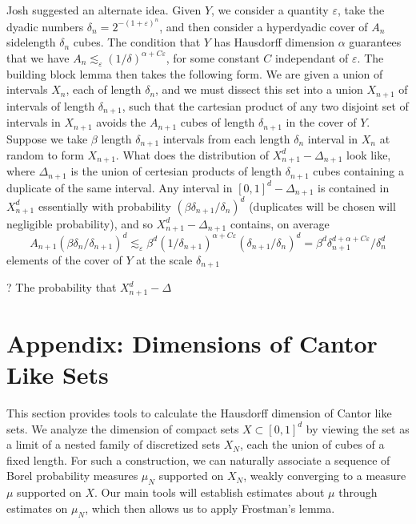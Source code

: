 \documentclass{report}
\theoremstyle{plain}
\theoremstyle{plain}
\begin{document}
Josh suggested an alternate idea. Given $Y$, we consider a quantity $\varepsilon$, take the dyadic numbers $\delta_n = 2^{-(1 + \varepsilon)^n}$, and then consider a hyperdyadic cover of $A_n$ sidelength $\delta_n$ cubes. The condition that $Y$ has Hausdorff dimension $\alpha$ guarantees that we have $A_n \lesssim_\varepsilon (1/\delta)^{\alpha + C\varepsilon}$, for some constant $C$ independant of $\varepsilon$. The building block lemma then takes the following form. We are given a union of intervals $X_n$, each of length $\delta_n$, and we must dissect this set into a union $X_{n+1}$ of intervals of length $\delta_{n+1}$, such that the cartesian product of any two disjoint set of intervals in $X_{n+1}$ avoids the $A_{n+1}$ cubes of length $\delta_{n+1}$ in the cover of $Y$. Suppose we take $\beta$ length $\delta_{n+1}$ intervals from each length $\delta_n$ interval in $X_n$ at random to form $X_{n+1}$. What does the distribution of $X_{n+1}^d - \Delta_{n+1}$ look like, where $\Delta_{n+1}$ is the union of certesian products of length $\delta_{n+1}$ cubes containing a duplicate of the same interval. Any interval in $[0,1]^d - \Delta_{n+1}$ is contained in $X_{n+1}^d$ essentially with probability $(\beta \delta_{n+1}/\delta_n)^d$ (duplicates will be chosen will negligible probability), and so $X_{n+1}^d - \Delta_{n+1}$ contains, on average
%
\[ A_{n+1} (\beta \delta_n/\delta_{n+1})^d \lesssim_\varepsilon \beta^d (1/\delta_{n+1})^{\alpha + C\varepsilon} (\delta_{n+1} / \delta_n)^d = \beta^d \delta_{n+1}^{d + \alpha + C \varepsilon} / \delta_n^d \]
%
elements of the cover of $Y$ at the scale $\delta_{n+1}$

? The probability that $X_{n+1}^d - \Delta$















\chapter{Appendix: Dimensions of Cantor Like Sets}

This section provides tools to calculate the Hausdorff dimension of Cantor like sets. We analyze the dimension of compact sets $X \subset [0,1]^d$ by viewing the set as a limit of a nested family of discretized sets $X_N$, each the union of cubes of a fixed length. For such a construction, we can naturally associate a sequence of Borel probability measures $\mu_N$ supported on $X_N$, weakly converging to a measure $\mu$ supported on $X$. Our main tools will establish estimates about $\mu$ through estimates on $\mu_N$, which then allows us to apply Frostman's lemma.
\end{document}

